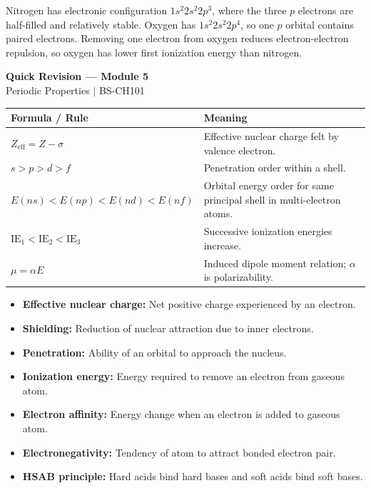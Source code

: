\documentclass[12pt,a4paper]{article}
\begin{document}
\begin{tcolorbox}[examplebox, title={Exam Answer: Why \texorpdfstring{$\mathrm{IE(N)>IE(O)}$}{IE(N)>IE(O)}?}]
Nitrogen has electronic configuration $1s^2 2s^2 2p^3$, where the three $p$ electrons are half-filled and relatively stable. Oxygen has $1s^2 2s^2 2p^4$, so one $p$ orbital contains paired electrons. Removing one electron from oxygen reduces electron-electron repulsion, so oxygen has lower first ionization energy than nitrogen.
\end{tcolorbox}
\newpage
\begin{center}
  {\large\bfseries\color{myred} Quick Revision --- Module 5}\\[3pt]
  {\small\color{mydark} Periodic Properties $|$ BS-CH101}
\end{center}
\noindent{\color{myred}\rule{\linewidth}{1.2pt}}
\vspace{4pt}

\begin{tcolorbox}[formulabox, title={Key Formulas at a Glance}]
\begin{tabularx}{\linewidth}{|B{4.0cm}|Y|}
\hline
\textbf{Formula / Rule} & \textbf{Meaning} \\
\hline
$Z_{\mathrm{eff}}=Z-\sigma$ & Effective nuclear charge felt by valence electron. \\
\hline
$s>p>d>f$ & Penetration order within a shell. \\
\hline
$E(ns)<E(np)<E(nd)<E(nf)$ & Orbital energy order for same principal shell in multi-electron atoms. \\
\hline
$\mathrm{IE_1}<\mathrm{IE_2}<\mathrm{IE_3}$ & Successive ionization energies increase. \\
\hline
$\mu=\alpha E$ & Induced dipole moment relation; $\alpha$ is polarizability. \\
\hline
\end{tabularx}
\end{tcolorbox}

\begin{tcolorbox}[defbox, title={One-Line Definitions}]
\begin{itemize}[leftmargin=*, itemsep=2pt, topsep=2pt]
  \item \textbf{Effective nuclear charge:} Net positive charge experienced by an electron.
  \item \textbf{Shielding:} Reduction of nuclear attraction due to inner electrons.
  \item \textbf{Penetration:} Ability of an orbital to approach the nucleus.
  \item \textbf{Ionization energy:} Energy required to remove an electron from gaseous atom.
  \item \textbf{Electron affinity:} Energy change when an electron is added to gaseous atom.
  \item \textbf{Electronegativity:} Tendency of atom to attract bonded electron pair.
  \item \textbf{HSAB principle:} Hard acids bind hard bases and soft acids bind soft bases.
\end{itemize}
\end{tcolorbox}
\end{document}
